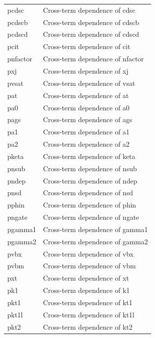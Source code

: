 \begin{longtable}{l l}
{\small pcdsc} & {\small Cross-term dependence of cdsc} \\
{\small pcdscb} & {\small Cross-term dependence of cdscb} \\ 
{\small pcdscd} & {\small Cross-term dependence of cdscd} \\
{\small pcit} & {\small Cross-term dependence of cit} \\
{\small pnfactor} & {\small Cross-term dependence of nfactor} \\
{\small pxj} & {\small Cross-term dependence of xj} \\
{\small pvsat} & {\small Cross-term dependence of vsat} \\
{\small pat} & {\small Cross-term dependence of at} \\
{\small pa0} & {\small Cross-term dependence of a0} \\ 
{\small pags} & {\small Cross-term dependence of ags} \\
{\small pa1} & {\small Cross-term dependence of a1} \\
{\small pa2} & {\small Cross-term dependence of a2} \\
{\small pketa} & {\small Cross-term dependence of keta} \\
{\small pnsub} & {\small Cross-term dependence of nsub} \\
{\small pndep} & {\small Cross-term dependence of ndep} \\
{\small pnsd} & {\small Cross-term dependence of nsd} \\
{\small pphin} & {\small Cross-term dependence of phin} \\
{\small pngate} & {\small Cross-term dependence of ngate} \\
{\small pgamma1} & {\small Cross-term dependence of gamma1} \\
{\small pgamma2} & {\small Cross-term dependence of gamma2} \\
{\small pvbx} & {\small Cross-term dependence of vbx} \\
{\small pvbm} & {\small Cross-term dependence of vbm} \\
{\small pxt} & {\small Cross-term dependence of xt} \\
{\small pk1} & {\small Cross-term dependence of k1} \\
{\small pkt1} & {\small Cross-term dependence of kt1} \\
{\small pkt1l} & {\small Cross-term dependence of kt1l} \\
{\small pkt2} & {\small Cross-term dependence of kt2} \\

\end{longtable}
